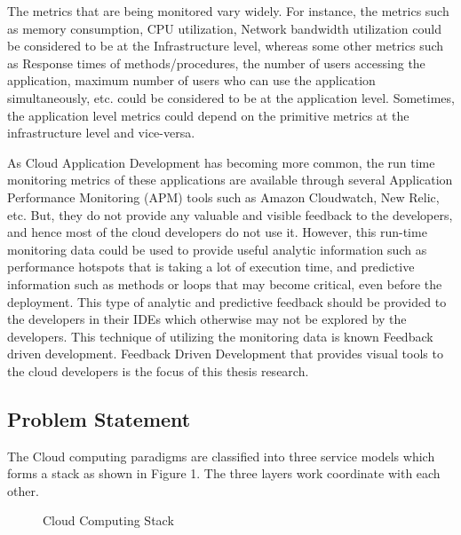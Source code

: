\documentclass[article,type=msc,colorback,12pt,accentcolor=tud7b,table]{tudthesis}
\begin{document}
	\par The metrics that are being monitored vary widely. For instance, the metrics such as memory consumption, CPU utilization, Network bandwidth utilization could be considered to be at the Infrastructure level, whereas some other metrics such as Response times of methods/procedures, the number of users accessing the application, maximum number of users who can use the application simultaneously, etc. could be considered to be at the application level. Sometimes, the application level metrics could depend on the primitive metrics at the infrastructure level and vice-versa.
	
	\par As Cloud Application Development has becoming more common, the run time monitoring metrics of these applications are available through several Application Performance Monitoring (APM) tools such as Amazon Cloudwatch, New Relic, etc. But, they do not provide any valuable and visible feedback to the developers, and hence most of the cloud developers do not use it. However, this run-time monitoring data could be used to provide useful analytic information such as performance hotspots that is taking a lot of execution time, and predictive information such as methods or loops that may become critical, even before the deployment. This type of analytic and predictive feedback should be provided to the developers in their IDEs which otherwise may not be explored by the developers. This technique of utilizing the monitoring data is known Feedback driven development. Feedback Driven Development that provides visual tools to the cloud developers is the focus of this thesis research.	
	
	\subsection{Problem Statement}	
	
The Cloud computing paradigms are classified into three service models which forms a stack as shown in Figure 1. The three layers work coordinate with each other.

 \begin{figure}
 \begin{center}
  \makebox[\textwidth]{\texttt{[image: A1]}}
\end{center}
\caption{Cloud Computing Stack}
\end{figure}

%	
%	
%	
	
\end{document}
